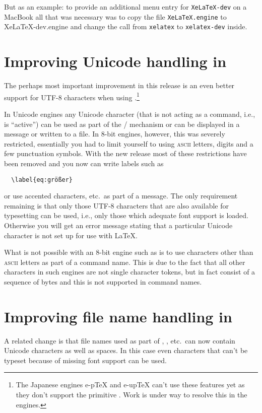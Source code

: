 \documentclass{ltnews}
\providecommand\acro[1]{\textsc{#1}}
\providecommand\pdfTeX{\hologo{pdfTeX}}
\begin{document}
But as an example: to provide an additional menu entry for
\texttt{XeLaTeX-dev} on a MacBook all that was necessary was to copy
the file \texttt{XeLaTeX.engine} to XeLaTeX-dev.engine and change the
call from \texttt{xelatex} to \texttt{xelatex-dev} inside.




\section{Improving Unicode handling in \pdfTeX{}}

The perhaps most important improvement in this release is an even
better support for UTF-8 characters when using \pdfTeX{}.\footnote{The
  Japanese engines e-p\TeX{} and e-up\TeX{} can't use these features
  yet as they don't support the primitive . Work is
  under way to resolve this in the engines.}

In Unicode engines any Unicode character (that is not acting as a
command, i.e., is \enquote{active}) can be used as part of the
/ mechanism or can be displayed in a message or
written to a file. In 8-bit engines, however, this was severely
restricted, essentially you had to limit yourself to using
\acro{ascii} letters, digits and a few punctuation symbols.  With the
new release most of these restrictions have been removed and you now
can write labels such as
\begin{verbatim}
  \label{eq:größer}
\end{verbatim}
or use accented characters, etc.\ as part of a  message.
The only requirement remaining is that only those UTF-8 characters
that are also available for typesetting can be used, i.e., only those
which adequate font support is loaded. Otherwise you will get an
error message stating that a particular Unicode character is not set
up for use with \LaTeX{}.

What is not possible with an 8-bit engine such as \pdfTeX{} is to use
characters other than \acro{ascii} letters as part of a command
name. This is due to the fact that all other characters in such
engines are not single character tokens, but in fact consist of a
sequence of bytes and this is not supported in command names.

\section{Improving file name handling in \pdfTeX{}}

A related change is that file names used as part of ,
, etc.\ can now contain Unicode characters as well
as spaces. In this case even characters that can't be typeset because
of missing font support can be used.
\end{document}
